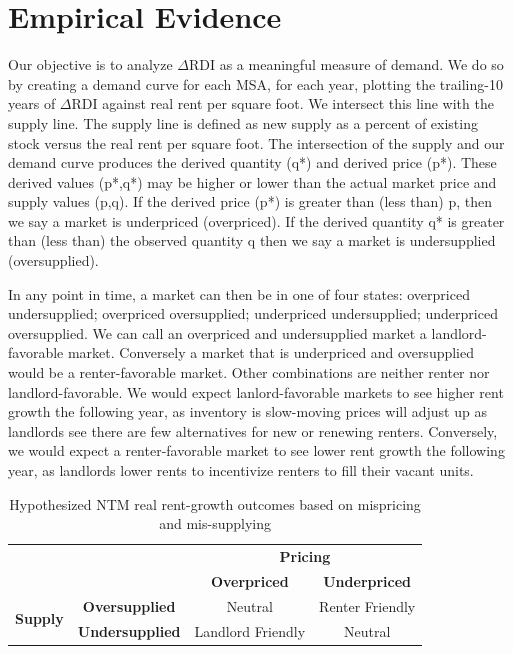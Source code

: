 \documentclass[sn-mathphys-num]{sn-jnl}%
\theoremstyle{thmstyleone}%
\theoremstyle{thmstyletwo}%
\theoremstyle{thmstylethree}%
\begin{document}
\section{Empirical Evidence}\label{sec2}
Our objective is to analyze $\Delta\text{RDI}$ as a meaningful measure of demand. We do so by creating a demand curve for each MSA, for each year, plotting the trailing-10 years of $\Delta\text{RDI}$ against real rent per square foot. We intersect this line with the supply line. The supply line is defined as new supply as a percent of existing stock versus the real rent per square foot. The intersection of the supply and our demand curve produces the derived quantity (q*) and derived price (p*). These derived values (p*,q*) may be higher or lower than the actual market price and supply values (p,q). If the derived price (p*) is greater than (less than) p, then we say a market is underpriced (overpriced). If the derived quantity q* is greater than (less than) the observed quantity q then we say a market is undersupplied (oversupplied).

In any point in time, a market can then be in one of four states: overpriced undersupplied; overpriced oversupplied; underpriced undersupplied; underpriced oversupplied. We can call an overpriced and undersupplied market a landlord-favorable market. Conversely a market that is underpriced and oversupplied would be a renter-favorable market. Other combinations are neither renter nor landlord-favorable. We would expect lanlord-favorable markets to see higher rent growth the following year, as inventory is slow-moving prices will adjust up as landlords see there are few alternatives for new or renewing renters. Conversely, we would expect a renter-favorable market to see lower rent growth the following year, as landlords lower rents to incentivize renters to fill their vacant units. 

\begin{table}[h!]
\centering
\begin{tabular}{cc|c|c|}
\multicolumn{2}{c}{} & \multicolumn{2}{c}{\textbf{Pricing}} \\
\multicolumn{2}{c}{} & \textbf{Overpriced} & \textbf{Underpriced} \\
\cmidrule{3-4}
\multirow{2}{*}{\textbf{Supply}} & \textbf{Oversupplied} & Neutral & Renter Friendly \\\cmidrule{2-4}
 & \textbf{Undersupplied} & Landlord Friendly & Neutral \\
\bottomrule
\end{tabular}
\caption{Hypothesized NTM real rent-growth outcomes based on mispricing and mis-supplying}
\end{table}
\end{document}
